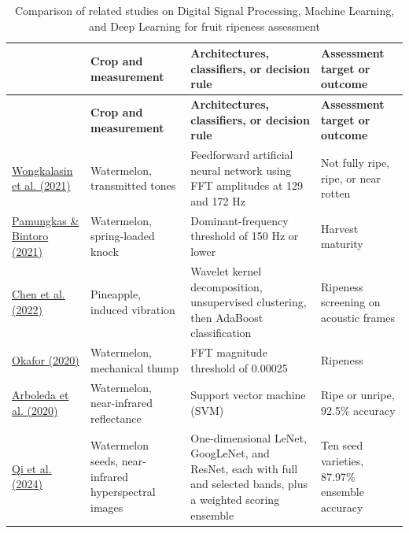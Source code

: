 \begin{thesisprose}
\FloatBarrier
\begin{landscape}
\begingroup
\small
\setlength{\tabcolsep}{3pt}
\renewcommand{\arraystretch}{1.14}
\setlength{\arrayrulewidth}{1.5pt}
\begin{longtable}{>{\centering\arraybackslash}p{}>{\centering\arraybackslash}p{}>{\centering\arraybackslash}p{}>{\centering\arraybackslash}p{}}
\caption{Comparison of related studies on Digital Signal Processing, Machine Learning, and Deep Learning for fruit ripeness assessment}\label{tab:comparison-of-related-studies-on-digital-signal-1348}\\
\hline
{\bfseries \textbf{Author(s)}} & {\bfseries \textbf{Crop and measurement}} & {\bfseries \textbf{Architectures, classifiers, or decision rule}} & {\bfseries \textbf{Assessment target or outcome}} \\
\hline
\endfirsthead
\hline
{\bfseries \textbf{Author(s)}} & {\bfseries \textbf{Crop and measurement}} & {\bfseries \textbf{Architectures, classifiers, or decision rule}} & {\bfseries \textbf{Assessment target or outcome}} \\
\hline
\endhead
\hyperlink{cite.wongkalasin2021}{Wongkalasin et al. (2021)} & Watermelon, transmitted tones & Feedforward artificial neural network using FFT amplitudes at 129 and 172 Hz & Not fully ripe, ripe, or near rotten \\
\hyperlink{cite.pamungkas2021}{Pamungkas \& Bintoro (2021)} & Watermelon, spring-loaded knock & Dominant-frequency threshold of 150 Hz or lower & Harvest maturity \\
\hyperlink{cite.chen2022}{Chen et al. (2022)} & Pineapple, induced vibration & Wavelet kernel decomposition, unsupervised clustering, then AdaBoost classification & Ripeness screening on acoustic frames \\
\hyperlink{cite.okafor2020}{Okafor (2020)} & Watermelon, mechanical thump & FFT magnitude threshold of 0.00025 & Ripeness \\
\hyperlink{cite.arboleda2020}{Arboleda et al. (2020)} & Watermelon, near-infrared reflectance & Support vector machine (SVM) & Ripe or unripe, 92.5\% accuracy \\
\hyperlink{cite.qi2024}{Qi et al. (2024)} & Watermelon seeds, near-infrared hyperspectral images & One-dimensional LeNet, GoogLeNet, and ResNet, each with full and selected bands, plus a weighted scoring ensemble & Ten seed varieties, 87.97\% ensemble accuracy \\

\end{longtable}
\end{landscape}
\end{thesisprose}
